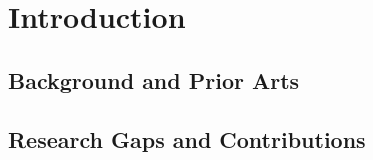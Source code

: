 \documentclass{article}
\begin{document}
\section{Introduction}

\subsection{Background and Prior Arts}

\subsection{Research Gaps and Contributions}
\end{document}
